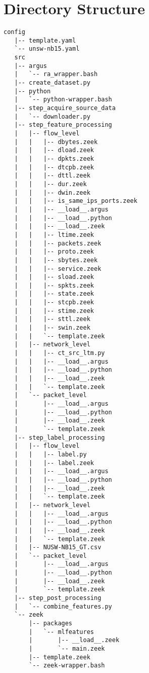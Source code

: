 \documentclass[sigconf, anonymous, screen]{acmart}
\begin{document}
\section{Directory Structure}
\begin{minipage}{\columnwidth}
\begin{lstlisting}[style=ascii-tree, label=lst:dirlisting, caption={
    A full directory listing of our source code used to implement the guidelines outlined in this paper.
    One can see how a large portion of the directory structure mirrors the structure of our YAML configuration files. 
    }, captionpos=b, basicstyle=\tiny, backgroundcolor=\color{gray!10!white}, frame=stb, breaklines=True]
   config
   |-- template.yaml
   `-- unsw-nb15.yaml
   src
   |-- argus
   |   `-- ra_wrapper.bash
   |-- create_dataset.py
   |-- python
   |   `-- python-wrapper.bash
   |-- step_acquire_source_data
   |   `-- downloader.py
   |-- step_feature_processing
   |   |-- flow_level
   |   |   |-- dbytes.zeek
   |   |   |-- dload.zeek
   |   |   |-- dpkts.zeek
   |   |   |-- dtcpb.zeek
   |   |   |-- dttl.zeek
   |   |   |-- dur.zeek
   |   |   |-- dwin.zeek
   |   |   |-- is_same_ips_ports.zeek
   |   |   |-- __load__.argus
   |   |   |-- __load__.python
   |   |   |-- __load__.zeek
   |   |   |-- ltime.zeek
   |   |   |-- packets.zeek
   |   |   |-- proto.zeek
   |   |   |-- sbytes.zeek
   |   |   |-- service.zeek
   |   |   |-- sload.zeek
   |   |   |-- spkts.zeek
   |   |   |-- state.zeek
   |   |   |-- stcpb.zeek
   |   |   |-- stime.zeek
   |   |   |-- sttl.zeek
   |   |   |-- swin.zeek
   |   |   `-- template.zeek
   |   |-- network_level
   |   |   |-- ct_src_ltm.py
   |   |   |-- __load__.argus
   |   |   |-- __load__.python
   |   |   |-- __load__.zeek
   |   |   `-- template.zeek
   |   `-- packet_level
   |       |-- __load__.argus
   |       |-- __load__.python
   |       |-- __load__.zeek
   |       `-- template.zeek
   |-- step_label_processing
   |   |-- flow_level
   |   |   |-- label.py
   |   |   |-- label.zeek
   |   |   |-- __load__.argus
   |   |   |-- __load__.python
   |   |   |-- __load__.zeek
   |   |   `-- template.zeek
   |   |-- network_level
   |   |   |-- __load__.argus
   |   |   |-- __load__.python
   |   |   |-- __load__.zeek
   |   |   `-- template.zeek
   |   |-- NUSW-NB15_GT.csv
   |   `-- packet_level
   |       |-- __load__.argus
   |       |-- __load__.python
   |       |-- __load__.zeek
   |       `-- template.zeek
   |-- step_post_processing
   |   `-- combine_features.py
   `-- zeek
       |-- packages
       |   `-- mlfeatures
       |       |-- __load__.zeek
       |       `-- main.zeek
       |-- template.zeek
       `-- zeek-wrapper.bash
\end{lstlisting}
\end{minipage}
\end{document}
